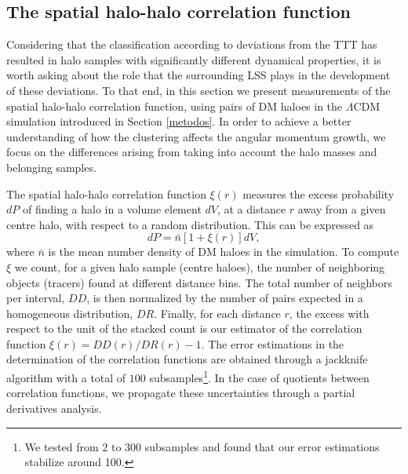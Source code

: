 \documentclass[fleqn,usenatbib]{mnras}
\begin{document}
\subsection{The spatial halo-halo correlation function}

Considering that the classification according to deviations from the TTT has resulted in halo samples with significantly different dynamical properties, it is worth asking about the role that the surrounding LSS plays in the development of these deviations. To that end, in this section we present measurements of the spatial halo-halo correlation function, using pairs of DM haloes in the $\Lambda$CDM simulation introduced in Section \ref{metodos}. In order to achieve a better understanding of how the clustering affects the angular momentum growth, we focus on the differences arising from taking into account the halo masses and belonging samples.

The spatial halo-halo correlation function $\xi(r)$ measures the excess probability $dP$ of finding a halo in a volume element $dV$, at a distance $r$ away from a given centre halo, with respect to a random distribution. This can be expressed as
\begin{equation*}
dP=\bar{n}[1+\xi(r)]dV,
\end{equation*}
where $\bar{n}$ is the mean number density of DM haloes in the simulation. To compute $\xi$ we count, for a given halo sample (centre haloes), the number of neighboring objects (tracers) found at different distance bins. The total number of neighbors per interval, $DD$, is then normalized by the number of pairs expected in a homogeneous distribution, $DR$. Finally, for each distance $r$, the excess with respect to the unit of the stacked count is our estimator of the correlation function $\xi(r)=DD(r)/DR(r)-1$. The error estimations in the determination of the correlation functions are obtained through a jackknife algorithm with a total of $100$ subsamples\footnote{We tested from 2 to 300 subsamples and found that our error estimations stabilize around 100.}. In the case of quotients between correlation functions, we propagate these uncertainties through a partial derivatives analysis.
\end{document}

